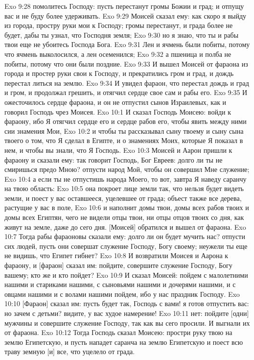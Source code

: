 Exo 9:28  помолитесь Господу: пусть перестанут громы Божии и град; и отпущу вас и не буду более удерживать.
Exo 9:29  Моисей сказал ему: как скоро я выйду из города, простру руки мои к Господу; громы перестанут, и града более не будет, дабы ты узнал, что Господня земля;
Exo 9:30  но я знаю, что ты и рабы твои еще не убоитесь Господа Бога.
Exo 9:31  Лен и ячмень были побиты, потому что ячмень выколосился, а лен осеменился;
Exo 9:32  а пшеница и полба не побиты, потому что они были поздние.
Exo 9:33  И вышел Моисей от фараона из города и простер руки свои к Господу, и прекратились гром и град, и дождь перестал литься на землю.
Exo 9:34  И увидел фараон, что перестал дождь и град и гром, и продолжал грешить, и отягчил сердце свое сам и рабы его.
Exo 9:35  И ожесточилось сердце фараона, и он не отпустил сынов Израилевых, как и говорил Господь чрез Моисея.
Exo 10:1  И сказал Господь Моисею: войди к фараону, ибо Я отягчил сердце его и сердце рабов его, чтобы явить между ними сии знамения Мои,
Exo 10:2  и чтобы ты рассказывал сыну твоему и сыну сына твоего о том, что Я сделал в Египте, и о знамениях Моих, которые Я показал в нем, и чтобы вы знали, что Я Господь.
Exo 10:3  Моисей и Аарон пришли к фараону и сказали ему: так говорит Господь, Бог Евреев: долго ли ты не смиришься предо Мною? отпусти народ Мой, чтобы он совершил Мне служение;
Exo 10:4  а если ты не отпустишь народа Моего, то вот, завтра Я наведу саранчу на твою область:
Exo 10:5  она покроет лице земли так, что нельзя будет видеть земли, и поест у вас оставшееся, уцелевшее от града; объест также все дерева, растущие у вас в поле,
Exo 10:6  и наполнит домы твои, домы всех рабов твоих и домы всех Египтян, чего не видели отцы твои, ни отцы отцов твоих со дня, как живут на земле, даже до сего дня. [Моисей] обратился и вышел от фараона.
Exo 10:7  Тогда рабы фараоновы сказали ему: долго ли он будет мучить нас? отпусти сих людей, пусть они совершат служение Господу, Богу своему; неужели ты еще не видишь, что Египет гибнет?
Exo 10:8  И возвратили Моисея и Аарона к фараону, и [фараон] сказал им: пойдите, совершите служение Господу, Богу вашему; кто же и кто пойдет?
Exo 10:9  И сказал Моисей: пойдем с малолетними нашими и стариками нашими, с сыновьями нашими и дочерями нашими, и с овцами нашими и с волами нашими пойдем, ибо у нас праздник Господу.
Exo 10:10  [Фараон] сказал им: пусть будет так, Господь с вами! я готов отпустить вас: но зачем с детьми? видите, у вас худое намерение!
Exo 10:11  нет: пойдите [одни] мужчины и совершите служение Господу, так как вы сего просили. И выгнали их от фараона.
Exo 10:12  Тогда Господь сказал Моисею: простри руку твою на землю Египетскую, и пусть нападет саранча на землю Египетскую и поест всю траву земную [и] все, что уцелело от града.
